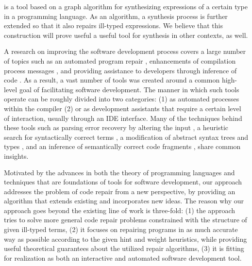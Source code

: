\ourTool is a tool based on a graph algorithm for synthesizing expressions of a certain type in a programming language. As an algorithm, a synthesis process is further 
extended so that it also repairs ill-typed expressions. We believe that this construction will prove useful a useful tool for synthesis in other contexts, as well.


A research on improving the software development process covers a large number of topics such as an automated
program repair
\cite{LeGoues:2012:ROI:2330163.2330296,WeiETAL10AutomatedFixingProgramsContracts,PeiETAL11CodebasedAutomatedProgramFixing},
enhancements of compilation process messages
\cite{Burke87apractical,Hammond198451,Lerner:2007:STM:1250734.1250783}, and
providing assistance to developers through inference of code
\cite{GveroETAL13CompleteCompletionTypesWeights,MandelinetALL2005Jungloid,KneussETAL13SynthesisModuloRecursiveFunctions,KuncakETAL13ExecutingSpecificationsSynthesisConstraintSolvingInvitedTalk,PerelmanGBG12}.
As a result, a vast number of tools was created around a common
high-level goal of facilitating software development.
The manner in which such tools operate can be roughly divided into two
categories: (1) as automated processes within the compiler 
(2) or as development assistants that require a certain level of
interaction, usually through an IDE interface.
Many of the techniques behind these tools such as parsing error recovery by altering the
input \cite{Burke87apractical}, a heuristic search for syntactically
correct terms \cite{PerelmanGBG12}, a modification of
abstract syntax trees and types \cite{Lerner:2007:STM:1250734.1250783}, and an inference
of semantically correct code fragments
\cite{KneussETAL13SynthesisModuloRecursiveFunctions}, share common insights.

Motivated by the advances in both the theory of programming languages and
techniques that are foundations of tools for software development, our
approach addresses the problem of code repair from a new perspective,
by providing an algorithm that extends existing and incorporates new
ideas.  The reason why our approach goes beyond the existing line of
work is three-fold: (1) the approach tries to solve more general code
repair problems constrained with the structure of given ill-typed
terms, (2) it focuses on repairing programs in as much accurate way as
possible according to the given hint and weight heuristics, while
providing useful theoretical guarantees about the utilized repair
algorithms, (3) it is fitting for realization as both an interactive
and automated software development tool.

